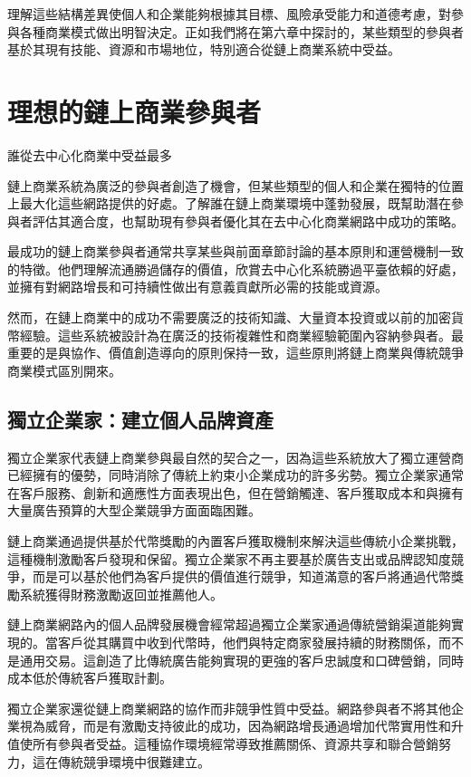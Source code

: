 \documentclass[
  Letterpaper,
]{scrbook}
\begin{document}
理解這些結構差異使個人和企業能夠根據其目標、風險承受能力和道德考慮，對參與各種商業模式做出明智決定。正如我們將在第六章中探討的，某些類型的參與者基於其現有技能、資源和市場地位，特別適合從鏈上商業系統中受益。

\chapter{理想的鏈上商業參與者}\label{sec-ideal-participants}

誰從去中心化商業中受益最多

鏈上商業系統為廣泛的參與者創造了機會，但某些類型的個人和企業在獨特的位置上最大化這些網路提供的好處。了解誰在鏈上商業環境中蓬勃發展，既幫助潛在參與者評估其適合度，也幫助現有參與者優化其在去中心化商業網路中成功的策略。

最成功的鏈上商業參與者通常共享某些與前面章節討論的基本原則和運營機制一致的特徵。他們理解流通勝過儲存的價值，欣賞去中心化系統勝過平臺依賴的好處，並擁有對網路增長和可持續性做出有意義貢獻所必需的技能或資源。

然而，在鏈上商業中的成功不需要廣泛的技術知識、大量資本投資或以前的加密貨幣經驗。這些系統被設計為在廣泛的技術複雜性和商業經驗範圍內容納參與者。最重要的是與協作、價值創造導向的原則保持一致，這些原則將鏈上商業與傳統競爭商業模式區別開來。

\section{獨立企業家：建立個人品牌資產}\label{ux7368ux7acbux4f01ux696dux5bb6ux5efaux7acbux500bux4ebaux54c1ux724cux8cc7ux7522}

獨立企業家代表鏈上商業參與最自然的契合之一，因為這些系統放大了獨立運營商已經擁有的優勢，同時消除了傳統上約束小企業成功的許多劣勢。獨立企業家通常在客戶服務、創新和適應性方面表現出色，但在營銷觸達、客戶獲取成本和與擁有大量廣告預算的大型企業競爭方面面臨困難。

鏈上商業通過提供基於代幣獎勵的內置客戶獲取機制來解決這些傳統小企業挑戰，這種機制激勵客戶發現和保留。獨立企業家不再主要基於廣告支出或品牌認知度競爭，而是可以基於他們為客戶提供的價值進行競爭，知道滿意的客戶將通過代幣獎勵系統獲得財務激勵返回並推薦他人。

鏈上商業網路內的個人品牌發展機會經常超過獨立企業家通過傳統營銷渠道能夠實現的。當客戶從其購買中收到代幣時，他們與特定商家發展持續的財務關係，而不是通用交易。這創造了比傳統廣告能夠實現的更強的客戶忠誠度和口碑營銷，同時成本低於傳統客戶獲取計劃。

獨立企業家還從鏈上商業網路的協作而非競爭性質中受益。網路參與者不將其他企業視為威脅，而是有激勵支持彼此的成功，因為網路增長通過增加代幣實用性和升值使所有參與者受益。這種協作環境經常導致推薦關係、資源共享和聯合營銷努力，這在傳統競爭環境中很難建立。
\end{document}
